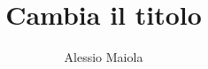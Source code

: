 \documentclass[noexaminfo,oneside,binding=0.6cm]{sapthesis}
\title{Cambia il titolo}
\author{Alessio Maiola}
\begin{document}
\frontmatter
\maketitle
\dedication{Dedicated to \\ Luigi Ricci}


\begin{acknowledgments}

\end{acknowledgments}


\begin{abstract}

\end{abstract}

\tableofcontents

\mainmatter




\backmatter
\cleardoublepage
{} %

\printbibliography
\end{document}
